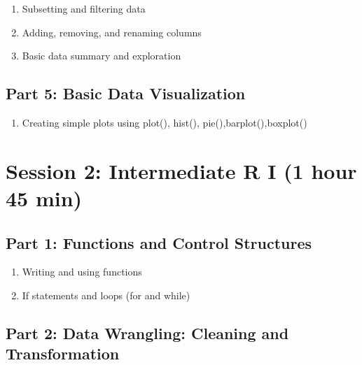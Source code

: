 \documentclass[
]{book}
\providecommand{\tightlist}{%
  \setlength{\itemsep}{0pt}\setlength{\parskip}{0pt}}
\begin{document}
\begin{enumerate}
\def\labelenumi{\arabic{enumi}.}
\tightlist
\item
  Subsetting and filtering data
\item
  Adding, removing, and renaming columns
\item
  Basic data summary and exploration
\end{enumerate}

\subsection*{Part 5: Basic Data Visualization}\label{part-5-basic-data-visualization}

\begin{enumerate}
\def\labelenumi{\arabic{enumi}.}
\tightlist
\item
  Creating simple plots using plot(), hist(), pie(),barplot(),boxplot()
\end{enumerate}

\section*{Session 2: Intermediate R I (1 hour 45 min)}\label{session-2-intermediate-r-i-1-hour-45-min}

\subsection*{Part 1: Functions and Control Structures}\label{part-1-functions-and-control-structures}

\begin{enumerate}
\def\labelenumi{\arabic{enumi}.}
\tightlist
\item
  Writing and using functions
\item
  If statements and loops (for and while)
\end{enumerate}

\subsection*{Part 2: Data Wrangling: Cleaning and Transformation}\label{part-2-data-wrangling-cleaning-and-transformation}
\end{document}
